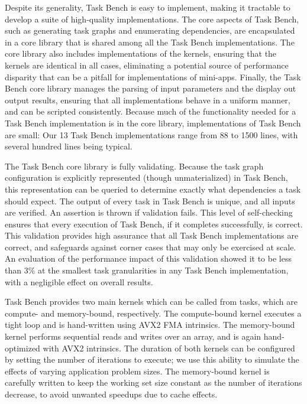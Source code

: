 

Despite its generality, Task Bench is easy to implement, making it
tractable to develop a suite of high-quality implementations. The core aspects of Task Bench, such as generating
task graphs and enumerating dependencies, are encapsulated in a core
library that is shared among all the Task Bench implementations. The
core library also includes implementations of the kernels, ensuring
that the kernels are identical in all cases, eliminating a potential
source of performance disparity that can be a pitfall for
implementations of mini-apps. Finally, the Task Bench core library manages the
parsing of input parameters and the display out output results,
ensuring that all implementations behave in a uniform manner, and can
be scripted consistently. Because much of the functionality needed for
a Task Bench implementation is in the core library, implementations of
Task Bench are small: Our 13 Task Bench implementations range from 88
to 1500 lines, with several hundred lines being typical.

The Task Bench core library is fully
validating. Because the task graph configuration is explicitly
represented (though unmaterialized) in Task Bench, this representation
can be queried to determine exactly what dependencies a task should
expect. The output of every task in Task Bench is unique,
and all inputs are verified. An assertion is thrown if validation
fails. This level of self-checking ensures that every execution of Task Bench, if it
completes successfully, is correct. This validation provides high
assurance that all Task Bench implementations are correct, and
safeguards against corner cases that may only be exercised at
scale. An evaluation of the performance impact of
this validation showed it to be less than 3\% at the smallest task
granularities in any Task Bench implementation, with a negligible
effect on overall results.

Task Bench provides two main kernels which can be called from tasks,
which are compute- and memory-bound, respectively. The compute-bound
kernel executes a tight loop and is hand-written using AVX2 FMA
intrinsics. The memory-bound kernel performs sequential reads and
writes over an array, and is again hand-optimized with AVX2
intrinsics. The duration of both kernels can be configured by setting
the number of iterations to execute; we use this ability to simulate
the effects of varying application problem sizes. The memory-bound
kernel is carefully written to keep the working set size constant as
the number of iterations decrease, to avoid unwanted speedups due to
cache effects.
